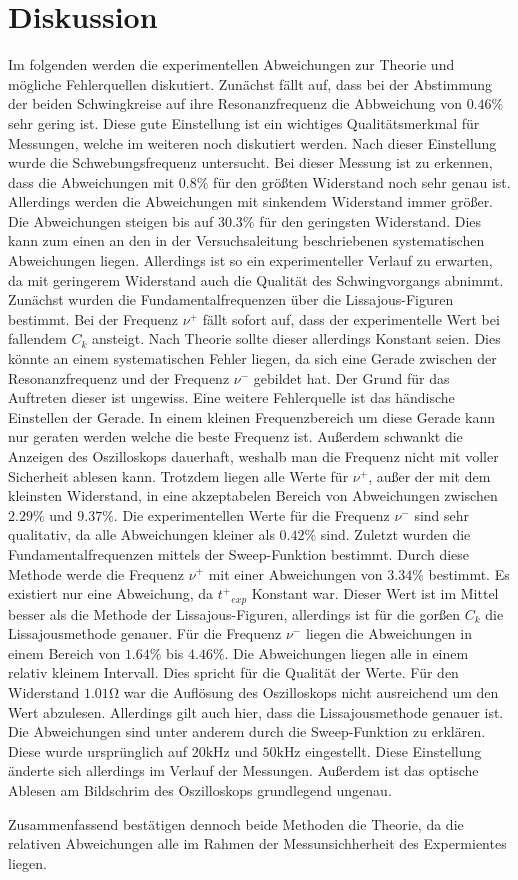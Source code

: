 \section{Diskussion}
\label{sec:Diskussion}
Im folgenden werden die experimentellen Abweichungen zur Theorie und mögliche Fehlerquellen diskutiert.
Zunächst fällt auf, dass bei der Abstimmung der beiden Schwingkreise auf ihre Resonanzfrequenz die Abbweichung von $0.46\%$ sehr gering ist. Diese gute Einstellung ist ein wichtiges Qualitätsmerkmal
für Messungen, welche im weiteren noch diskutiert werden. Nach dieser Einstellung wurde die Schwebungsfrequenz untersucht. Bei dieser Messung ist zu erkennen, dass die Abweichungen mit $0.8\%$ für
den größten Widerstand noch sehr genau ist. Allerdings werden die Abweichungen mit sinkendem Widerstand immer größer. Die Abweichungen steigen bis auf $30.3\%$ für den geringsten Widerstand. Dies 
kann zum einen an den in der Versuchsaleitung \cite{v355} beschriebenen systematischen Abweichungen liegen. Allerdings ist so ein experimenteller Verlauf zu erwarten, da mit geringerem Widerstand 
auch die Qualität des Schwingvorgangs abnimmt. Zunächst wurden die Fundamentalfrequenzen über die Lissajous-Figuren bestimmt. Bei der Frequenz $\nu^+$ fällt sofort auf, dass der experimentelle Wert
bei fallendem $C_k$ ansteigt. Nach Theorie sollte dieser allerdings Konstant seien. Dies könnte an einem systematischen Fehler liegen, da sich eine Gerade zwischen der Resonanzfrequenz und der Frequenz
$\nu^-$ gebildet hat. Der Grund für das Auftreten dieser ist ungewiss. Eine weitere Fehlerquelle ist das händische Einstellen der Gerade. In einem kleinen Frequenzbereich um diese Gerade kann nur geraten werden 
welche die beste Frequenz ist. Außerdem schwankt die Anzeigen des Oszilloskops dauerhaft, weshalb man die Frequenz nicht mit voller Sicherheit ablesen kann. Trotzdem liegen alle Werte
für $\nu^+$, außer der mit dem kleinsten Widerstand, in eine akzeptabelen Bereich von Abweichungen zwischen $2.29\%$ und $9.37\%$. Die experimentellen Werte für die Frequenz $\nu^-$ sind sehr 
qualitativ, da alle Abweichungen kleiner als $0.42\%$ sind. Zuletzt wurden die Fundamentalfrequenzen mittels der Sweep-Funktion bestimmt. Durch diese Methode werde die Frequenz $\nu^+$ mit einer 
Abweichungen von $3.34\%$ bestimmt. Es existiert nur eine Abweichung, da ${t^+}_{exp}$ Konstant war. Dieser Wert ist im Mittel besser als die Methode der Lissajous-Figuren, allerdings ist für die gorßen 
$C_k$ die Lissajousmethode genauer. Für die Frequenz $\nu^-$ liegen die Abweichungen in einem Bereich von $1.64\%$ bis $4.46\%$. Die Abweichungen liegen alle in einem relativ kleinem Intervall. 
Dies spricht für die Qualität der Werte. Für den Widerstand $1.01\unit{\ohm}$ war die Auflösung des Oszilloskops nicht ausreichend um den Wert abzulesen. Allerdings gilt auch hier, dass die Lissajousmethode 
genauer ist. Die Abweichungen sind unter anderem durch die Sweep-Funktion zu erklären. Diese wurde ursprünglich auf $20 \unit{\kilo\hertz}$ und $50 \unit{\kilo\hertz}$ eingestellt. 
Diese Einstellung änderte sich allerdings im Verlauf der Messungen. Außerdem ist das optische Ablesen am Bildschrim des Oszilloskops grundlegend ungenau.


Zusammenfassend bestätigen dennoch beide Methoden die Theorie, da die relativen Abweichungen alle im Rahmen der Messunsichherheit des Expermientes liegen. 